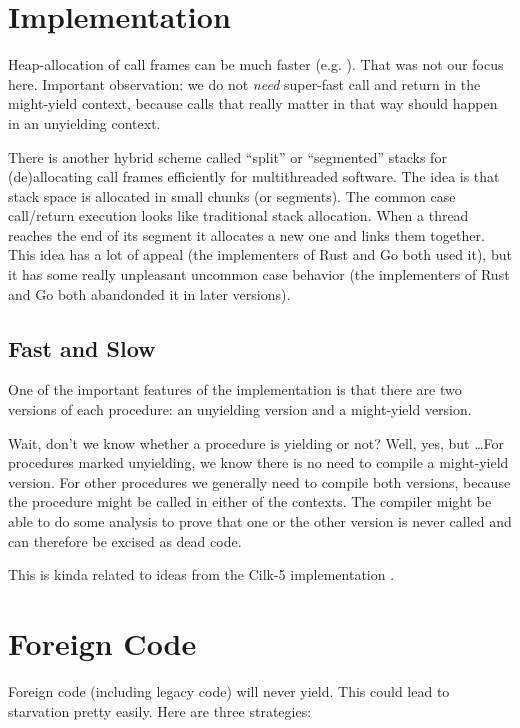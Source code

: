 \documentclass[11pt,preprint]{sigplanconf}
\begin{document}
\section{Implementation}

Heap-allocation of call frames can be much faster
(e.g. \cite{Shao2000}).  That was not our focus here.  Important
observation: we do not \emph{need} super-fast call and return in the
might-yield context, because calls that really matter in that way should
happen in an unyielding context.

There is another hybrid scheme called ``split'' or ``segmented'' stacks
for (de)allocating call frames efficiently for multithreaded software.
The idea is that stack space is allocated in small chunks (or segments).
The common case call/return execution looks like traditional stack
allocation.  When a thread reaches the end of its segment it allocates a
new one and links them together.  This idea has a lot of appeal (the
implementers of Rust and Go both used it), but it has some really
unpleasant uncommon case behavior (the implementers of Rust and Go both
abandonded it in later versions).

\subsection{Fast and Slow}

One of the important features of the implementation is that there are
two versions of each procedure: an unyielding version and a might-yield
version.

Wait, don't we know whether a procedure is yielding or not?  Well, yes,
but \ldots For procedures marked unyielding, we know there is no need to
compile a might-yield version.  For other procedures we generally need
to compile both versions, because the procedure might be called in
either of the contexts.  The compiler might be able to do some analysis
to prove that one or the other version is never called and can therefore
be excised as dead code.

This is kinda related to ideas from the Cilk-5 implementation
\cite{Frigo1998}.

\section{Foreign Code}

Foreign code (including legacy code) will never yield.  This could lead
to starvation pretty easily.  Here are three strategies:
\end{document}
